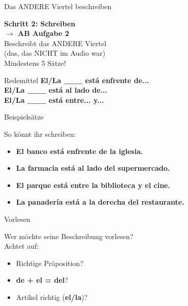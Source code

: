 \documentclass[aspectratio=169,11pt]{beamer}
\newcommand{\es}[1]{\textcolor{spanisch}{\textbf{#1}}}
\begin{document}
\begin{frame}{Das ANDERE Viertel beschreiben}
\begin{center}
{\LARGE\bfseries Schritt 2: Schreiben}\\[0.5cm]
{\Large\bfseries $\rightarrow$ AB Aufgabe 2}\\[0.8cm]
{\Large Beschreibt das ANDERE Viertel}\\
{\normalsize (das, das NICHT im Audio war)}\\[0.8cm]
{\Large Mindestens 5 Sätze!}\\[0.5cm]
\begin{block}{Redemittel}
\es{El/La \_\_\_ está enfrente de...}\\
\es{El/La \_\_\_ está al lado de...}\\
\es{El/La \_\_\_ está entre... y...}
\end{block}
\end{center}
\end{frame}

\begin{frame}{Beispielsätze}
\begin{center}
{\Large So könnt ihr schreiben:}\\[0.8cm]
\begin{itemize}
\setlength\itemsep{0.5em}
\item \es{El banco está enfrente de la iglesia.}
\item \es{La farmacia está al lado del supermercado.}
\item \es{El parque está entre la biblioteca y el cine.}
\item \es{La panadería está a la derecha del restaurante.}
\end{itemize}
\end{center}
\end{frame}

\begin{frame}{Vorlesen}
\begin{center}
{\Large Wer möchte seine Beschreibung vorlesen?}\\[1cm]
{\normalsize Achtet auf:}\\[0.5cm]
\begin{itemize}
\item Richtige Präposition?
\item \es{de + el = del}?
\item Artikel richtig (\es{el/la})?
\end{itemize}
\end{center}
\end{frame}
\end{document}
